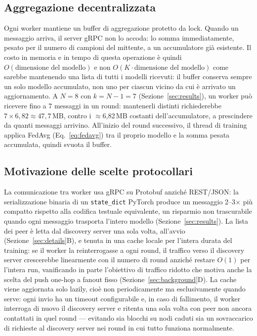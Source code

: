\subsection{Aggregazione decentralizzata}
Ogni worker mantiene un buffer di aggregazione protetto da lock. Quando un
messaggio arriva, il server gRPC non lo accoda: lo somma
immediatamente, pesato per il numero di campioni del mittente, a un
accumulatore già esistente. Il costo in memoria e
in tempo di questa operazione è quindi $O(\text{dimensione del modello})$ e
non $O(K \cdot \text{dimensione del modello})$ come sarebbe mantenendo una
lista di tutti i modelli ricevuti: il buffer conserva sempre un solo modello
accumulato, non uno per ciascun vicino da cui è arrivato un aggiornamento. A
$N=8$ con $k=N-1=7$ (Sezione~\ref{sec:results}), un worker può ricevere fino
a 7 messaggi in un round: mantenerli distinti richiederebbe
$7\times6{,}82\approx47{,}7$\,MB, contro i $\approx$6,82\,MB costanti
dell'accumulatore, a prescindere da quanti messaggi arrivino. All'inizio del round successivo, il thread
di training applica FedAvg (Eq.~\ref{eq:fedavg}) tra il proprio modello e la
somma pesata accumulata, quindi svuota il buffer.

\subsection{Motivazione delle scelte protocollari}
La comunicazione tra worker usa gRPC su Protobuf anziché REST/JSON: la
serializzazione binaria di un \texttt{state\_dict} PyTorch produce un
messaggio 2--3$\times$ più compatto rispetto alla codifica testuale
equivalente, un risparmio non trascurabile quando ogni messaggio trasporta
l'intero modello (Sezione~\ref{sec:results}). La lista dei peer è letta dal
discovery server una sola volta, all'avvio (Sezione~\ref{sec:details}B), e
tenuta in una cache locale per l'intera durata del training: se il worker
la reinterrogasse a ogni round, il traffico verso il discovery server
crescerebbe linearmente con il numero di round anziché restare $O(1)$ per
l'intera run, vanificando in parte l'obiettivo di traffico ridotto che
motiva anche la scelta del push one-hop a fanout fisso
(Sezione~\ref{sec:background}D). La cache
viene aggiornata solo lazily, cioè non periodicamente ma esclusivamente
quando serve: ogni invio ha un timeout configurabile e, in caso di
fallimento, il worker interroga di nuovo il discovery server e ritenta una
sola volta con peer non ancora contattati in quel round — evitando sia
blocchi su nodi caduti sia un sovraccarico di richieste al discovery server
nei round in cui tutto funziona normalmente.